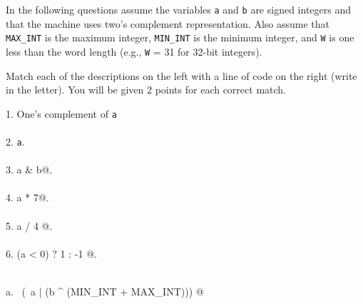 \begin{problem}{12}

\noindent
In the following questions assume the variables {\tt a} and {\tt b} are signed
integers and that the machine uses two's complement representation.  Also
assume that {\tt MAX\_INT} is the maximum integer, {\tt MIN\_INT} is
the minimum integer, and {\tt W} is one less than the word length
(e.g., {\tt W} = 31 for 32-bit integers).

\noindent

Match each of the descriptions on the left with a line of code
on the right (write in the letter).  You will be given 2 points
for each correct match.

\vspace{0.3in}
\begin{minipage}{2.1in}
1. One's complement of {\tt a} \\

\makebox[.3in]{}\hrulefill \mbox{}\\[.1in]

2. {\tt a}.\\

\makebox[.3in]{}\hrulefill \mbox{}\\[.1in]

3. \verb@ a & b@.\\

\makebox[.3in]{}\hrulefill \mbox{}\\[.1in]

4. \verb@ a * 7@.\\

\makebox[.3in]{}\hrulefill \mbox{}\\[.1in]

5. \verb@ a / 4 @.\\

\makebox[.3in]{}\hrulefill \mbox{}\\[.1in]

6. \verb@ (a < 0) ? 1 : -1 @.\\

\makebox[.3in]{}\hrulefill \mbox{}\\[.1in]

\end{minipage}\makebox[1in]{}
\begin{minipage}{3.3in}

a. \verb@ ~(~a | (b ^ (MIN_INT + MAX_INT))) @\\[.2in]


\end{minipage}
\end{problem}
